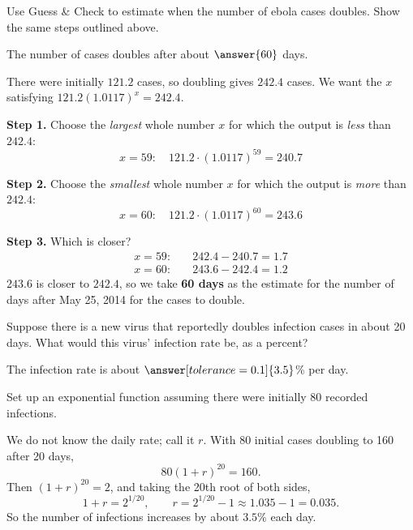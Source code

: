 \documentclass[12pt]{ximera}
\begin{document}
\begin{problem}
Use Guess \& Check to estimate when the number of ebola cases doubles. Show the same
steps outlined above.

The number of cases doubles after about $\answer{60}$ days.

\begin{hint}
There were initially $121.2$ cases, so doubling gives $242.4$ cases. We want the $x$
satisfying $121.2(1.0117)^{x} = 242.4$.
\end{hint}

\begin{solution}
\textbf{Step 1.} Choose the \emph{largest} whole number $x$ for which the output is
\emph{less} than $242.4$:
\[
x = 59: \quad 121.2 \cdot (1.0117)^{59} = 240.7
\]

\textbf{Step 2.} Choose the \emph{smallest} whole number $x$ for which the output is
\emph{more} than $242.4$:
\[
x = 60: \quad 121.2 \cdot (1.0117)^{60} = 243.6
\]

\textbf{Step 3.} Which is closer?
\[
\begin{aligned}
x = 59: \quad & 242.4 - 240.7 = 1.7 \\
x = 60: \quad & 243.6 - 242.4 = 1.2
\end{aligned}
\]
$243.6$ is closer to $242.4$, so we take \textbf{60 days} as the estimate for the
number of days after May 25, 2014 for the cases to double.
\end{solution}
\end{problem}

\begin{problem}
Suppose there is a new virus that reportedly doubles infection cases in about 20
days. What would this virus' infection rate be, as a percent?

The infection rate is about $\answer[tolerance=0.1]{3.5}$\% per day.

\begin{hint}
Set up an exponential function assuming there were initially 80 recorded infections.
\end{hint}

\begin{solution}
We do not know the daily rate; call it $r$. With 80 initial cases doubling to 160
after 20 days,
\[
80(1+r)^{20} = 160.
\]
Then $(1+r)^{20} = 2$, and taking the 20th root of both sides,
\[
1 + r = 2^{1/20}, \qquad r = 2^{1/20} - 1 \approx 1.035 - 1 = 0.035.
\]
So the number of infections increases by about $3.5\%$ each day.
\end{solution}
\end{problem}
\end{document}
